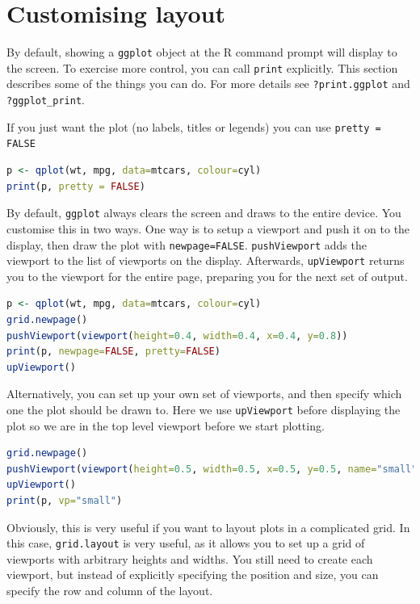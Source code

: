 \section{Customising layout}
\label{sec:grid-layout}

By default, showing a {\tt ggplot} object at the R command prompt will display to the screen.  To exercise more control, you can call {\tt print} explicitly.  This section describes some of the things you can do.  For more details see {\tt ?print.ggplot} and {\tt ?ggplot\_print}.

If you just want the plot (no labels, titles or legends) you can use {\tt pretty = FALSE}

\begin{lstlisting}[language = R]
p <- qplot(wt, mpg, data=mtcars, colour=cyl)
print(p, pretty = FALSE)
\end{lstlisting}

By default, {\tt ggplot} always clears the screen and draws to the entire device.  You customise this in two ways. One way is to setup a viewport and push it on to the display, then draw the plot with {\tt newpage=FALSE}. {\tt pushViewport} adds the viewport to the list of viewports on the display.   Afterwards, {\tt upViewport} returns you to the viewport for the entire page, preparing you for the next set of output.

\begin{lstlisting}[language = R]
p <- qplot(wt, mpg, data=mtcars, colour=cyl)
grid.newpage()
pushViewport(viewport(height=0.4, width=0.4, x=0.4, y=0.8))
print(p, newpage=FALSE, pretty=FALSE)
upViewport()
\end{lstlisting}

Alternatively, you can set up your own set of viewports, and then specify which one the plot should be drawn to.  Here we use {\tt upViewport} before displaying the plot so we are in the top level viewport before we start plotting.

\begin{lstlisting}[language = R]
grid.newpage()
pushViewport(viewport(height=0.5, width=0.5, x=0.5, y=0.5, name="small", angle=40))
upViewport()
print(p, vp="small")
\end{lstlisting}

Obviously, this is very useful if you want to layout plots in a complicated grid.  In this case, {\tt grid.layout} is very useful, as it allows you to set up a grid of viewports with arbitrary heights and widths.  You still need to create each viewport, but instead of explicitly specifying the position and size, you can specify the row and column of the layout.

